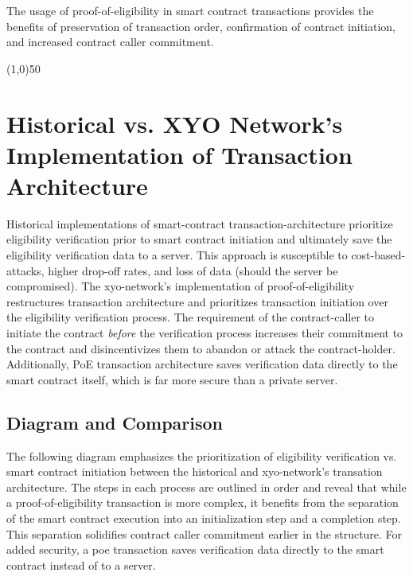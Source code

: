 \documentclass{article}
\begin{document}
The usage of \Gls{proof-of-eligibility} in smart contract transactions provides the benefits of preservation of transaction order, confirmation of contract initiation, and increased contract caller commitment.

\begin{center}
\line(1,0){50}
\end{center}

\section{Historical vs. XYO Network's Implementation of Transaction Architecture}
Historical implementations of \gls{smart-contract} \gls{transaction-architecture} prioritize eligibility verification prior to smart contract initiation and ultimately save the eligibility verification data to a server. This approach is susceptible to \glspl{cost-based-attack}, higher drop-off rates, and loss of data (should the server be compromised). The \Gls{xyo-network}'s implementation of \Gls{proof-of-eligibility} restructures transaction architecture and prioritizes transaction initiation over the eligibility verification process. The requirement of the \gls{contract-caller} to initiate the contract \textit{before} the verification process increases their commitment to the contract and disincentivizes them to abandon or attack the \gls{contract-holder}. Additionally, PoE transaction architecture saves verification data directly to the smart contract itself, which is far more secure than a private server.

\subsection{Diagram and Comparison}
The following diagram emphasizes the prioritization of eligibility verification vs. smart contract initiation between the historical and \Gls{xyo-network}'s transation architecture. The steps in each process are outlined in order and reveal that while a \Gls{proof-of-eligibility} transaction is more complex, it benefits from the separation of the smart contract execution into an initialization step and a completion step.  This separation solidifies contract caller commitment earlier in the structure. For added security, a \acrshort{poe} transaction saves verification data directly to the smart contract instead of to a server.
\end{document}
